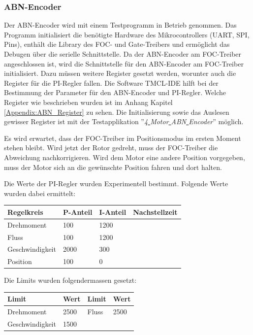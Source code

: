 \subsubsection{ABN-Encoder}
\label{subsubsec:Inbetriebnahme_ABN-Encoder}

Der ABN-Encoder wird mit einem Testprogramm in Betrieb genommen. Das Programm initialisiert die benötigte Hardware des Mikrocontrollers (UART, SPI, Pins), enthält die Library des FOC- und Gate-Treibers und ermöglicht das Debugen über die serielle Schnittstelle. Da der ABN-Encoder am FOC-Treiber angeschlossen ist, wird die Schnittstelle für den ABN-Encoder am FOC-Treiber initialisiert. Dazu müssen weitere Register gesetzt werden, worunter auch die Register für die PI-Regler fallen. Die Software TMCL-IDE hilft bei der Bestimmung der Parameter für den ABN-Encoder und PI-Regler. Welche Register wie beschrieben wurden ist im Anhang Kapitel \ref{Appendix:ABN_Register} zu sehen. Die Initialisierung sowie das Auslesen gewisser Register ist mit der Testapplikation ''\textit{4\underline{ }Motor\underline{ }ABN\underline{ }Encoder}'' möglich.

Es wird erwartet, dass der FOC-Treiber im Positionsmodus im ersten Moment stehen bleibt. Wird jetzt der Rotor gedreht, muss der FOC-Treiber die Abweichung nachkorrigieren. Wird dem Motor eine andere Position vorgegeben, muss der Motor sich an die gewünschte Position fahren und dort halten.

Die Werte der PI-Regler wurden Experimentell bestimmt. Folgende Werte wurden dabei ermittelt:

\begin{tabularx}{\linewidth}{|l|X|X|l|}
\hline
\textbf{Regelkreis} & \textbf{P-Anteil} & \textbf{I-Anteil} & \textbf{Nachstellzeit}\\
\hline
Drehmoment & 100 & 1200 & \\
\hline
Fluss & 100 & 1200 & \\
\hline
Geschwindigkeit & 2000 & 300 & \\
\hline
Position & 100 & 0 & \\
\hline
\end{tabularx}


Die Limits wurden folgendermassen gesetzt:

\begin{tabularx}{\linewidth}{|l|X||l|X|}
\hline
\textbf{Limit} & \textbf{Wert} & \textbf{Limit} & \textbf{Wert}\\
\hline
Drehmoment & 2500 & Fluss & 2500\\
\hline
Geschwindigkeit & 1500 &  & \\
\hline
\end{tabularx}

